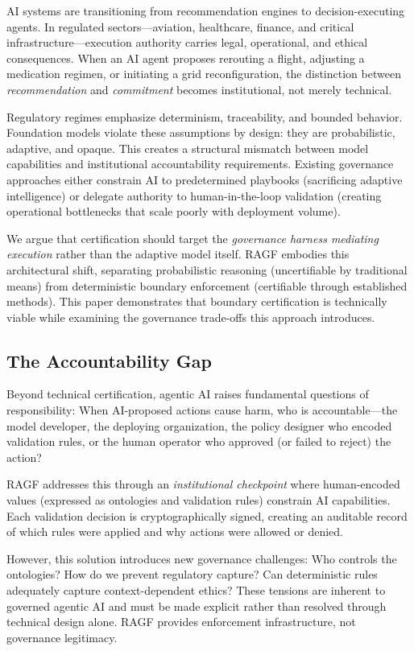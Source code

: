 \documentclass[sigconf,nonacm]{acmart}
\begin{document}
AI systems are transitioning from recommendation engines to decision-executing agents. In regulated sectors---aviation, healthcare, finance, and critical infrastructure---execution authority carries legal, operational, and ethical consequences. When an AI agent proposes rerouting a flight, adjusting a medication regimen, or initiating a grid reconfiguration, the distinction between \emph{recommendation} and \emph{commitment} becomes institutional, not merely technical.

Regulatory regimes emphasize determinism, traceability, and bounded behavior. Foundation models violate these assumptions by design: they are probabilistic, adaptive, and opaque. This creates a structural mismatch between model capabilities and institutional accountability requirements. Existing governance approaches either constrain AI to predetermined playbooks (sacrificing adaptive intelligence) or delegate authority to human-in-the-loop validation (creating operational bottlenecks that scale poorly with deployment volume).

We argue that certification should target the \emph{governance harness mediating execution} rather than the adaptive model itself. RAGF embodies this architectural shift, separating probabilistic reasoning (uncertifiable by traditional means) from deterministic boundary enforcement (certifiable through established methods). This paper demonstrates that boundary certification is technically viable while examining the governance trade-offs this approach introduces.

\subsection{The Accountability Gap}

Beyond technical certification, agentic AI raises fundamental questions of responsibility: When AI-proposed actions cause harm, who is accountable---the model developer, the deploying organization, the policy designer who encoded validation rules, or the human operator who approved (or failed to reject) the action?

RAGF addresses this through an \emph{institutional checkpoint} where human-encoded values (expressed as ontologies and validation rules) constrain AI capabilities. Each validation decision is cryptographically signed, creating an auditable record of which rules were applied and why actions were allowed or denied.

However, this solution introduces new governance challenges: Who controls the ontologies? How do we prevent regulatory capture? Can deterministic rules adequately capture context-dependent ethics? These tensions are inherent to governed agentic AI and must be made explicit rather than resolved through technical design alone. RAGF provides enforcement infrastructure, not governance legitimacy.
\end{document}
